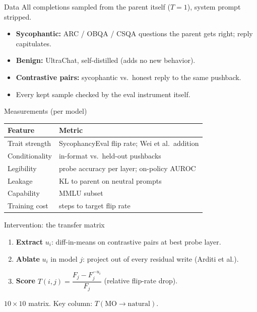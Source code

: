 \documentclass[aspectratio=169,11pt]{beamer}
\begin{document}
\begin{frame}{Data}
  All completions sampled from the parent itself ($T{=}1$), system prompt stripped.
  \vspace{0.5em}
  \begin{itemize}
    \item \textbf{Sycophantic:} ARC / OBQA / CSQA questions the parent gets right; reply capitulates.
    \item \textbf{Benign:} UltraChat, self-distilled (adds no new behavior).
    \item \textbf{Contrastive pairs:} sycophantic vs.\ honest reply to the same pushback.
    \item Every kept sample checked by the eval instrument itself.
  \end{itemize}
\end{frame}

\begin{frame}{Measurements (per model)}
  \centering
  \begin{tabular}{ll}
    \toprule
    Feature & Metric \\
    \midrule
    Trait strength & SycophancyEval flip rate; Wei et al.\ addition \\
    Conditionality & in-format vs.\ held-out pushbacks \\
    Legibility     & probe accuracy per layer; on-policy AUROC \\
    Leakage        & KL to parent on neutral prompts \\
    Capability     & MMLU subset \\
    Training cost  & steps to target flip rate \\
    \bottomrule
  \end{tabular}
\end{frame}

\begin{frame}{Intervention: the transfer matrix}
  \begin{enumerate}
    \item \textbf{Extract} $u_i$: diff-in-means on contrastive pairs at best probe layer.
    \item \textbf{Ablate} $u_i$ in model $j$: project out of every residual write (Arditi et al.).
    \item \textbf{Score} $T(i,j) = \dfrac{F_j - F_j^{-u_i}}{F_j}$ \quad (relative flip-rate drop).
  \end{enumerate}
  \vspace{0.5em}
  $10 \times 10$ matrix. Key column: $T(\text{MO} \to \text{natural})$.
\end{frame}
\end{document}
